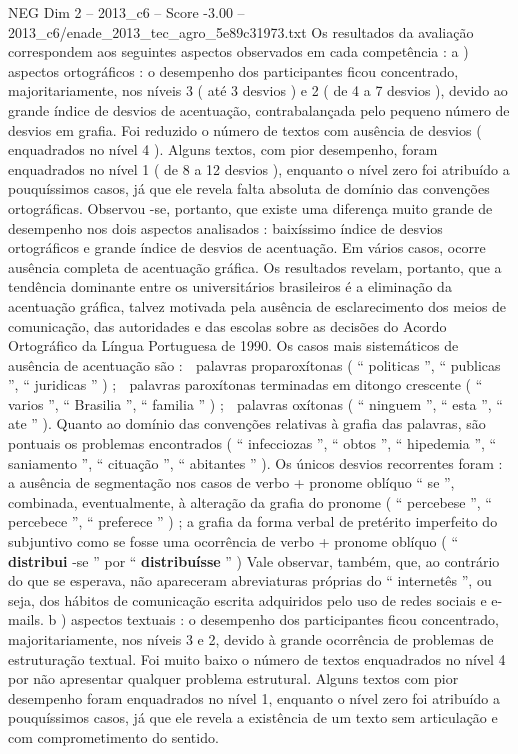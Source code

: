 \begin{textsample}{NEG Dim 2 – 2013\_c6 – Score -3.00 – 2013\_c6/enade\_2013\_tec\_agro\_5e89c31973.txt}
Os resultados da avaliação correspondem aos seguintes aspectos observados em cada competência : a ) aspectos ortográficos : o desempenho dos participantes ficou concentrado, majoritariamente, nos níveis 3 ( até 3 desvios ) e 2 ( de 4 a 7 desvios ), devido ao grande índice de desvios de acentuação, contrabalançada pelo pequeno número de desvios em grafia.
Foi reduzido o número de textos com ausência de desvios ( enquadrados no nível 4 ).
Alguns textos, com pior desempenho, foram enquadrados no nível 1 ( de 8 a 12 desvios ), enquanto o nível zero foi atribuído a pouquíssimos casos, já que ele revela falta absoluta de domínio das convenções ortográficas.
Observou -se, portanto, que existe uma diferença muito grande de desempenho nos dois aspectos analisados : baixíssimo índice de desvios ortográficos e grande índice de desvios de acentuação.
Em vários casos, ocorre ausência completa de acentuação gráfica.
Os resultados revelam, portanto, que a tendência dominante entre os universitários brasileiros é a eliminação da acentuação gráfica, talvez motivada pela ausência de esclarecimento dos meios de comunicação, das autoridades e das escolas sobre as decisões do Acordo Ortográfico da Língua Portuguesa de 1990.
Os casos mais sistemáticos de ausência de acentuação são :  palavras proparoxítonas ( “ politicas ”, “ publicas ”, “ juridicas ” ) ;  palavras paroxítonas terminadas em ditongo crescente ( “ varios ”, “ Brasilia ”, “ familia ” ) ;  palavras oxítonas ( “ ninguem ”, “ esta ”, “ ate ” ).
Quanto ao domínio das convenções relativas à grafia das palavras, são pontuais os problemas encontrados ( “ infecciozas ”, “ obtos ”, “ hipedemia ”, “ saniamento ”, “ cituação ”, “ abitantes ” ).
Os únicos desvios recorrentes foram : a ausência de segmentação nos casos de verbo + pronome oblíquo “ se ”, combinada, eventualmente, à alteração da grafia do pronome ( “ percebese ”, “ percebece ”, “ preferece ” ) ; a grafia da forma verbal de pretérito imperfeito do subjuntivo como se fosse uma ocorrência de verbo + pronome oblíquo ( “ \textbf{distribui} -se ” por “ \textbf{distribuísse} ” ) Vale observar, também, que, ao contrário do que se esperava, não apareceram abreviaturas próprias do “ internetês ”, ou seja, dos hábitos de comunicação escrita adquiridos pelo uso de redes sociais e e-mails. b ) aspectos textuais : o desempenho dos participantes ficou concentrado, majoritariamente, nos níveis 3 e 2, devido à grande ocorrência de problemas de estruturação textual.
Foi muito baixo o número de textos enquadrados no nível 4 por não apresentar qualquer problema estrutural.
Alguns textos com pior desempenho foram enquadrados no nível 1, enquanto o nível zero foi atribuído a pouquíssimos casos, já que ele revela a existência de um texto sem articulação e com comprometimento do sentido.

\end{textsample}
